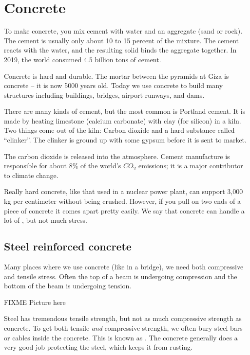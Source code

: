 \chapter{Concrete}

To make concrete, you mix cement with water and an aggregate (sand or
rock).  The cement is usually only about 10 to 15 percent of the
mixture. The cement reacts with the water, and the resulting solid
binds the aggregate together. In 2019, the world consumed 4.5 billion
tons of cement. 

Concrete is hard and durable. The mortar between the pyramids at Giza
is concrete -- it is now 5000 years old. Today we use concrete to
build many structures including buildings, bridges, airport runways,
and dams.

There are many kinds of cement, but the most common is Portland
cement. It is made by heating limestone (calcium carbonate) with clay
(for silicon) in a kiln. Two things come out of the kiln: Carbon
dioxide and a hard substance called ``clinker''.  The clinker is
ground up with some gypsum before it is sent to market.

The carbon dioxide is released into the atmosphere. Cement manufacture
is responsible for about 8\% of the world's $CO_2$ emissions; it is a
major contributor to climate change.

Really hard concrete, like that used in a nuclear power plant, can
support 3,000 kg per centimeter without being crushed.  However, if
you pull on two ends of a piece of concrete it comes apart pretty
easily. We say that concrete can handle a lot of , but not much  stress.

\section{Steel reinforced concrete}

Many places where we use concrete (like in a bridge), we need both
compressive and tensile stress.  Often the top of a beam is undergoing
compression and the bottom of the beam is undergoing tension.

FIXME Picture here

Steel has tremendous tensile strength, but not as much compressive
strength as concrete. To get both tensile \emph{and} compressive
strength, we often bury steel bars or cables inside the concrete.
This is known as . The concrete
generally does a very good job protecting the steel, which keeps it
from rusting.

